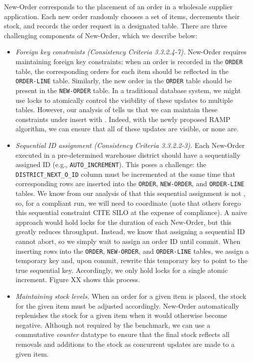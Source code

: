 New-Order corresponds to the placement of an order in a wholesale
supplier application. Each new order randomly chooses a set of items,
decrements their stock, and records the order request in a designated
table. There are three challenging components of New-Order, which we
describe below:
\begin{itemize}

\item \textit{Foreign key constraints (Consistency Criteria
  3.3.2.4-7).} New-Order requires maintaining foreign key constraints:
  when an order is recorded in the \texttt{ORDER} table, the
  corresponding orders for each item should be reflected in the
  \texttt{ORDER-LINE} table. Similarly, the new order in the
  \texttt{ORDER} table should be present in the \texttt{NEW-ORDER}
  table. In a traditional database system, we might use locks to
  atomically control the visibility of these updates to multiple
  tables. However, our analysis of \lang tells us that we can maintain
  these constraints under insert with \cfreedom. Indeed, with the
  newly proposed \cfree RAMP algorithm, we can ensure that all of
  these updates are visible, or none are.

\item \textit{Sequential ID assignment (Consistency Criteria
  3.3.2.2-3).} Each New-Order executed in a pre-determined warehouse
  district should have a sequentially assigned ID (e.g.,
  \texttt{AUTO\_INCREMENT}). This poses a challenge: the
  \texttt{DISTRICT\_NEXT\_O\_ID} column must be incremented at the
  same time that corresponding rows are inserted into the
  \texttt{ORDER}, \texttt{NEW-ORDER}, and \texttt{ORDER-LINE}
  tables. We know from our analysis of \lang that this sequential
  assignment is not \cfree, so, for a compliant run, we will need to
  coordinate (note that others forego this sequential constraint CITE
  SILO at the expense of compliance). A naive approach would hold
  locks for the duration of each New-Order, but this greatly reduces
  throughput. Instead, we know that assigning a sequential ID cannot
  abort, so we simply wait to assign an order ID until commit. When
  inserting rows into the \texttt{ORDER}, \texttt{NEW-ORDER}, and
  \texttt{ORDER-LINE} tables, we assign a temporary key and, upon
  commit, rewrite this temporary key to point to the true sequential
  key. Accordingly, we only hold locks for a single atomic
  increment. Figure XX shows this process.

\item \textit{Maintaining stock levels.} When an order for a given
  item is placed, the stock for the given item must be adjusted
  accordingly. New-Order automatically replenishes the stock for a
  given item when it would otherwise become negative. Although not
  required by the benchmark, we can use a commutative \textit{counter}
  datatype to ensure that the final stock reflects all removals and
  additions to the stock as concurrent updates are made to a given item.
\end{itemize}


